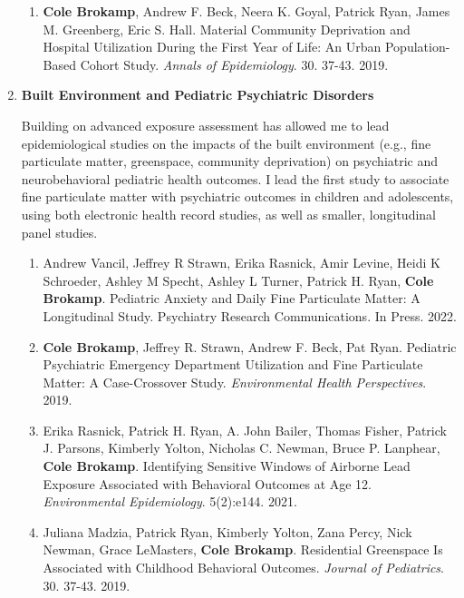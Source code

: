 \documentclass{nihbiosketch}
\begin{document}
\begin{enumerate}
\begin{enumerate}
  \item \textbf{Cole Brokamp}, Andrew F. Beck, Neera K. Goyal, Patrick Ryan,
    James M. Greenberg, Eric S. Hall. Material Community Deprivation and
    Hospital Utilization During the First Year of Life: An Urban
    Population-Based Cohort Study. \textit{Annals of Epidemiology}. 30. 37-43.
    2019.

\end{enumerate}

\item \textbf{Built Environment and Pediatric Psychiatric Disorders}

  Building on advanced exposure assessment has allowed me to lead epidemiological studies on the impacts of the built environment (e.g., fine particulate matter, greenspace, community deprivation) on psychiatric and neurobehavioral pediatric health outcomes. I lead the first study to associate fine particulate matter with psychiatric outcomes in children and adolescents, using both electronic health record studies, as well as smaller, longitudinal panel studies.

  \begin{enumerate}

  \item Andrew Vancil, Jeffrey R Strawn, Erika Rasnick, Amir Levine,
    Heidi K Schroeder, Ashley M Specht, Ashley L Turner, Patrick H. Ryan,
    \textbf{Cole Brokamp}. Pediatric Anxiety and Daily Fine Particulate Matter:
    A Longitudinal Study. Psychiatry Research Communications. In Press. 2022.

  \item \textbf{Cole Brokamp}, Jeffrey R. Strawn, Andrew F. Beck, Pat Ryan.
    Pediatric Psychiatric Emergency Department Utilization and Fine
    Particulate Matter: A Case-Crossover Study. \textit{Environmental Health
      Perspectives}. 2019.
 
  \item Erika Rasnick, Patrick H. Ryan, A. John Bailer, Thomas Fisher, Patrick
    J. Parsons, Kimberly Yolton, Nicholas C. Newman, Bruce P. Lanphear,
    \textbf{Cole Brokamp}. Identifying Sensitive Windows of Airborne Lead
    Exposure Associated with Behavioral Outcomes at Age 12.
    \textit{Environmental Epidemiology}. 5(2):e144. 2021.

  \item Juliana Madzia, Patrick Ryan, Kimberly Yolton, Zana Percy, Nick Newman, Grace
    LeMasters, \textbf{Cole Brokamp}. Residential Greenspace Is Associated with Childhood
    Behavioral Outcomes. \textit{Journal of Pediatrics}. 30. 37-43. 2019.


\end{enumerate}
\end{enumerate}
\end{document}
